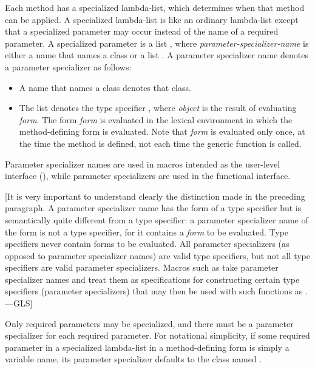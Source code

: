 Each method has a {\bit specialized lambda-list}, which determines
when that method can be applied.  A specialized lambda-list is like
an ordinary lambda-list except that a {\bit specialized parameter\/}
may occur instead of the name of a required parameter.  A specialized parameter
is a list ,
where {\it parameter-specializer-name\/} is either
a name that names a class or a list .
A parameter specializer name denotes a parameter specializer as follows:

\begin{itemize}
\item  A name that names a class denotes that class.

\item  The list  denotes the type specifier
, where {\it object\/} is the result of
evaluating {\it form\/}.  The form {\it form\/} is evaluated in the
lexical environment in which the method-defining form is
evaluated.  Note that {\it form\/} is evaluated only once, at the time
the method is defined, not each time the generic function is called.
\end{itemize}

Parameter specializer names are used in macros intended as the
user-level interface (), while parameter specializers
are used in the functional interface.

[It is very important to understand clearly the distinction made
in the preceding paragraph.  A parameter specializer name
has the form of a type specifier but is semantically quite different
from a type specifier: a parameter specializer name of the form
 is not a type specifier, for it contains
a {\it form\/} to be evaluated.   Type specifiers
never contain forms to be evaluated.  All parameter specializers
(as opposed to parameter specializer names) are valid type specifiers,
but not all type specifiers are valid parameter specializers.  Macros such as 
take parameter specializer names and treat them as specifications for
constructing certain type specifiers (parameter specializers) that may then be used
with such functions as .---GLS]


Only required parameters may be specialized, and there must be a
parameter specializer for each required parameter.  For notational
simplicity, if some required parameter in a specialized lambda-list in
a method-defining form is simply a variable name, its parameter
specializer defaults to the class named .


